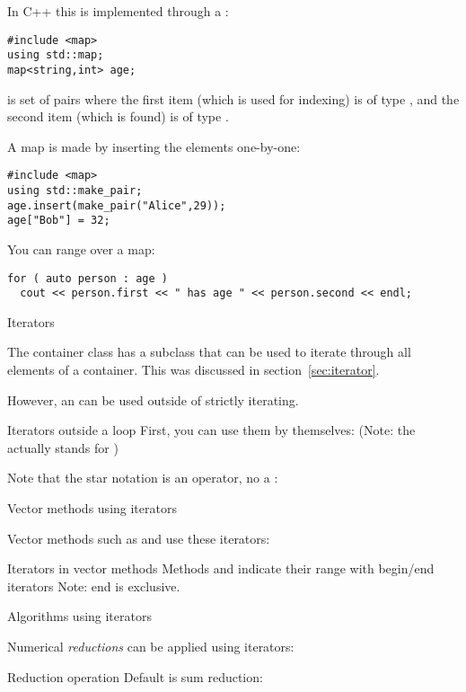 In C++ this is implemented through a :
\begin{lstlisting}
#include <map>
using std::map;
map<string,int> age;
\end{lstlisting}
is set of
pairs where the first item (which is used for indexing) is of type
, and the second item (which is found) is of type .

A map is made by inserting the elements one-by-one:
\begin{lstlisting}
#include <map>
using std::make_pair;
age.insert(make_pair("Alice",29));
age["Bob"] = 32;
\end{lstlisting}

You can range over a map:
\begin{lstlisting}
for ( auto person : age )
  cout << person.first << " has age " << person.second << endl;
\end{lstlisting}

 {Iterators}
\label{sec:iterator-class}

The container class has a subclass  that can be
used to iterate through all elements of a container. This was
discussed in section~\ref{sec:iterator}.

However, an  can be used outside of strictly iterating.
\begin{block}{Iterators outside a loop}
  \label{sl:vec-iterator}
  First, you can use them by themselves:
  (Note: the  actually stands for )
\end{block}

Note that the star notation is an operator, no a
:
%

 {Vector methods using iterators}

Vector methods such as  and  use
these iterators:
\begin{block}{Iterators in vector methods}
  \label{sl:vec-erase}
  Methods  and  indicate their range with begin/end
  iterators
  Note: end is exclusive.
\end{block}

 {Algorithms using iterators}

Numerical \emph{reductions} can be applied using iterators:
\begin{block}{Reduction operation}
  \label{sl:vec-accumulate}
  Default is sum reduction:
\end{block}

